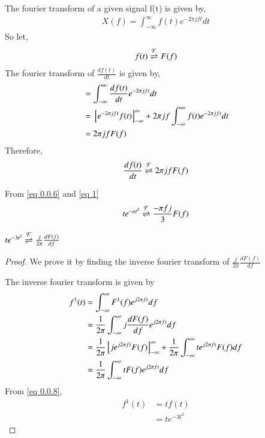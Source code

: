 \documentclass[journal,12pt,twocolumn]{IEEEtran}
\begin{document}
        The fourier transform of a given signal f(t) is given by,
        \begin{align}
            X(f) = \int_{-\infty}^{\infty} f(t) e^{-2\pi jft} dt
        \end{align}
       So let,
        \begin{align}
            f(t) \overset{\mathcal{F}}{ \rightleftharpoons} F(f)
        \end{align}
        The fourier transform of $\frac{d f(t)}{dt}$ is given by,
        \begin{align}
            &= \int_{-\infty}^{\infty}  \frac{df(t)}{dt} e^{-2\pi jft} dt\\
            &= {}\left[e^{-2\pi jft} f(t)\right]_{-\infty}^{\infty} + 2\pi jf\int_{-\infty}^{\infty} f(t) e^{-2\pi jft} dt\\
            &= 2\pi jfF(f)
            \end{align}
        Therefore,
        \begin{align}
            \frac{df(t)}{dt} \overset{\mathcal{F}}{ \rightleftharpoons} 2\pi jfF(f) \label {eq 0.0.6}
        \end{align}
        
        From \eqref{eq 0.0.6} and \eqref{eq 1}
        \begin{align}
            te^{-at^2} \overset{\mathcal{F}}{ \rightleftharpoons} \frac{-\pi fj}{3} F(f) \label{eq 0.0.7}
        \end{align}
        
        \begin{lemma}
        $te^{-3t^2} \overset{\mathcal{F}}{ \rightleftharpoons} \frac{j}{2\pi}\frac{dF(f)}{df}$ 
        \label{lemma 1}
        \end{lemma}
        \begin{proof}
        We prove it by finding the inverse fourier transform of $\frac{j}{2\pi}\frac{dF(f)}{df}$
        
        The inverse fourier transform is given by
        \begin{align}
            f^1(t) &= \int_{-\infty}^{\infty} F^1(f)e^{j2\pi ft} df\\\label{eq 0.0.8}
            &= \frac{1}{2\pi} \int_{-\infty}^{\infty} j\frac{dF(f)}{df}
            e^{j2\pi ft} df\\
            &= \frac{1}{2\pi} {}\left[je^{j2\pi ft} F(f)\right]_{-\infty}^{\infty} + \frac{1}{2\pi} \int_{-\infty}^{\infty} te^{j2\pi ft} F(f) df \\
            &= \frac{1}{2\pi} \int_{-\infty}^{\infty} t F(f) e^{j2\pi ft} df 
        \end{align}
        From \eqref{eq 0.0.8}, 
        \begin{align}
            f^1(t) &= tf(t)\\
            &= te^{-3t^2} 
        \end{align}
        \end{proof}
        
\end{document}
